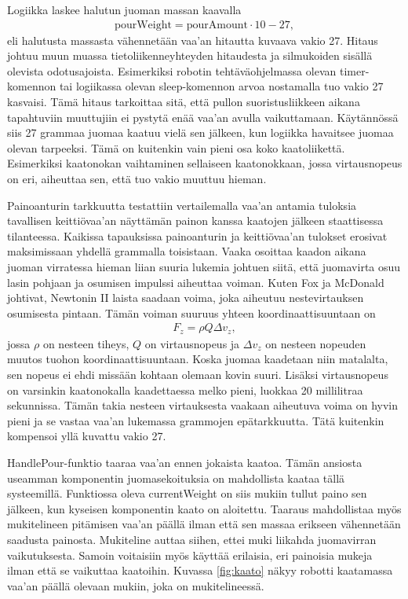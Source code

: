 Logiikka laskee halutun juoman massan kaavalla
\begin{align}
    \mathrm{pourWeight} = \mathrm{pourAmount} \cdot 10 - 27 \mathrm{,}
\end{align}
eli halutusta massasta vähennetään vaa'an hitautta kuvaava vakio 27. Hitaus johtuu muun muassa tietoliikenneyhteyden hitaudesta ja silmukoiden sisällä olevista odotusajoista. Esimerkiksi robotin tehtäväohjelmassa olevan timer-komennon tai logiikassa olevan sleep-komennon arvoa nostamalla tuo vakio 27 kasvaisi. Tämä hitaus tarkoittaa sitä, että pullon suoristusliikkeen aikana tapahtuviin muuttujiin ei pystytä enää vaa'an avulla vaikuttamaan. Käytännössä siis 27 grammaa juomaa kaatuu vielä sen jälkeen, kun logiikka havaitsee juomaa olevan tarpeeksi. Tämä on kuitenkin vain pieni osa koko kaatoliikettä. Esimerkiksi kaatonokan vaihtaminen sellaiseen kaatonokkaan, jossa virtausnopeus on eri, aiheuttaa sen, että tuo vakio muuttuu hieman.

Painoanturin tarkkuutta testattiin vertailemalla vaa'an antamia tuloksia tavallisen keittiövaa'an näyttämän painon kanssa kaatojen jälkeen staattisessa tilanteessa. Kaikissa tapauksissa painoanturin ja keittiövaa'an tulokset erosivat maksimissaan yhdellä grammalla toisistaan. Vaaka osoittaa kaadon aikana juoman virratessa hieman liian suuria lukemia johtuen siitä, että juomavirta osuu lasin pohjaan ja osumisen impulssi aiheuttaa voiman. Kuten Fox ja McDonald \cite[s.197-198]{Fox2011} johtivat, Newtonin II laista saadaan voima, joka aiheutuu nestevirtauksen osumisesta pintaan. Tämän voiman suuruus yhteen koordinaattisuuntaan on
\begin{align}
    F_z = \rho Q \Delta v_z \mathrm{,}
\end{align}
jossa $\rho$ on nesteen tiheys, $Q$ on virtausnopeus ja $\Delta v_z$ on nesteen nopeuden muutos tuohon koordinaattisuuntaan. Koska juomaa kaadetaan niin matalalta, sen nopeus ei ehdi missään kohtaan olemaan kovin suuri. Lisäksi virtausnopeus on varsinkin kaatonokalla kaadettaessa melko pieni, luokkaa 20 millilitraa sekunnissa. Tämän takia nesteen virtauksesta vaakaan aiheutuva
voima on hyvin pieni ja se vastaa vaa'an lukemassa grammojen epätarkkuutta. Tätä kuitenkin kompensoi yllä kuvattu vakio 27.

HandlePour-funktio taaraa vaa'an ennen jokaista kaatoa. Tämän ansiosta useamman komponentin juomasekoituksia on mahdollista kaataa tällä systeemillä. Funktiossa oleva currentWeight on siis mukiin tullut paino sen jälkeen, kun kyseisen komponentin kaato on aloitettu. Taaraus mahdollistaa myös mukitelineen pitämisen vaa'an päällä ilman että sen massaa erikseen vähennetään saadusta painosta. Mukiteline auttaa siihen, ettei muki liikahda juomavirran vaikutuksesta. Samoin voitaisiin myös käyttää erilaisia, eri painoisia mukeja ilman että se vaikuttaa kaatoihin. Kuvassa \ref{fig:kaato} näkyy robotti kaatamassa vaa'an päällä olevaan mukiin, joka on mukitelineessä.

